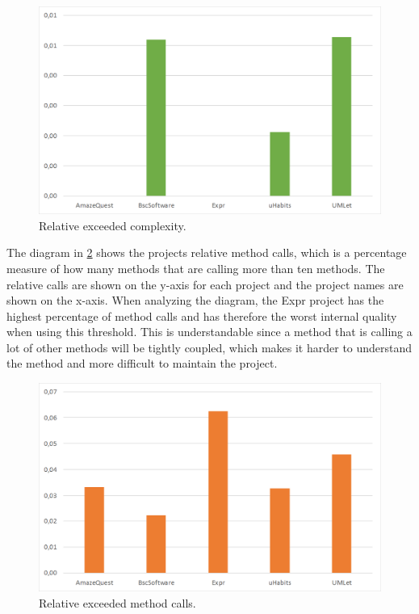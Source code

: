\documentclass[conference]{IEEEtran}
\begin{document}
\begin{figure}
	\includegraphics[width=\columnwidth]{img/rel_exceeded_complexity.png}
\caption{Relative exceeded complexity.}
\label{fig:exceed_complexity}
\end{figure}


The diagram in \cref{fig:exceed_calls} shows the projects relative method calls, which is a percentage measure of how many methods that are calling more than ten methods. The relative calls are shown on the y-axis for each project and the project names are shown on the x-axis. When analyzing the diagram, the Expr project has the highest percentage of method calls and has therefore the worst internal quality when using this threshold. This is understandable since a method that is calling a lot of other methods will be tightly coupled, which makes it harder to understand the method and more difficult to maintain the project. 


\begin{figure}
	\includegraphics[width=\columnwidth]{img/rel_exceeded_calls.png}
\caption{Relative exceeded method calls.}
\label{fig:exceed_calls}
\end{figure}
\end{document}
